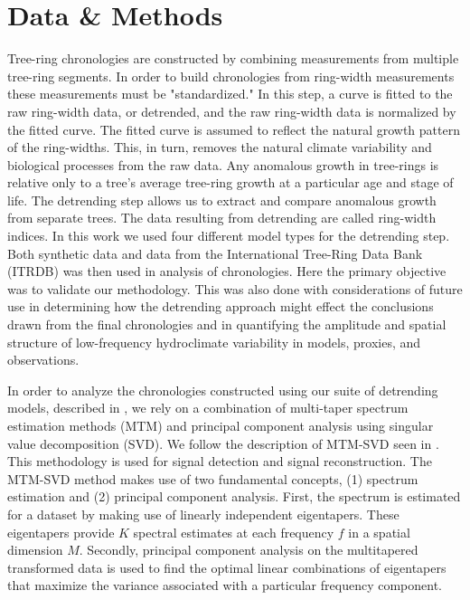 \documentclass[phd,tocprelim]{cornell}
\begin{document}
\section{Data \& Methods}
Tree-ring chronologies are constructed by combining measurements from  
multiple tree-ring segments. In order to build chronologies 
from ring-width measurements these measurements must 
be "standardized." In this step, a curve is fitted to the 
raw ring-width data, or detrended, and the raw ring-width 
data is normalized by the fitted curve. The fitted curve is 
assumed to reflect the natural growth pattern of the ring-widths. 
This, in turn, removes the natural climate variability and 
biological processes from the raw data. Any anomalous growth in 
tree-rings is relative only to a tree's average tree-ring growth at a 
particular age and stage of life. The detrending step allows us to 
extract and compare anomalous growth from separate trees. 
The data resulting from detrending are called ring-width indices. 
In this work we used four different model types for the detrending step. 
Both synthetic data and data from the International Tree-Ring 
Data Bank (ITRDB) was then used in analysis of chronologies. 
Here the primary objective was to validate our methodology. 
This was also done with considerations of future use in 
determining how the detrending approach might effect the 
conclusions drawn from the final chronologies and in 
quantifying the amplitude and spatial structure of low-frequency 
hydroclimate variability in models, proxies, and observations.
\par
In order to analyze the chronologies constructed using our suite of 
detrending models, described in , we rely on 
a combination of multi-taper spectrum estimation methods (MTM) and 
principal component analysis using singular value decomposition (SVD). 
We follow the description of MTM-SVD seen in \cite{mann1999oscillatory}. 
This methodology is used for signal detection and signal reconstruction. 
The MTM-SVD method makes use of two fundamental concepts, (1) spectrum 
estimation and (2) principal component analysis. First, the spectrum 
is estimated for a dataset by making use of linearly independent 
eigentapers. These eigentapers provide $K$ spectral estimates at each 
frequency $f$ in a spatial dimension $M$. Secondly, principal component 
analysis on the multitapered transformed data is used to find the optimal 
linear combinations of eigentapers that maximize the variance associated with 
a particular frequency component. 
\end{document}
